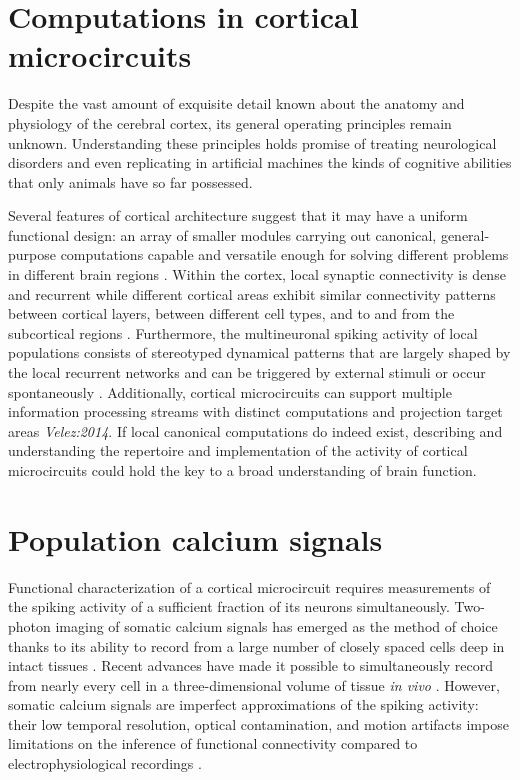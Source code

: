 \section{Computations in cortical microcircuits}
Despite the vast amount of exquisite detail known about the anatomy and physiology of the cerebral cortex, its general operating principles remain unknown. 
Understanding these principles holds promise of treating neurological disorders and even replicating in artificial machines the kinds of cognitive abilities that only animals have so far possessed.

Several features of cortical architecture suggest that it may have a uniform functional design: an array of smaller modules carrying out canonical, general-purpose computations capable and versatile enough for solving different problems in different brain regions \citep{Mountcastle:1997, Douglas:2007}. 
Within the cortex, local synaptic connectivity is dense and recurrent while different cortical areas exhibit similar connectivity patterns between cortical layers, between different cell types, and to and from the subcortical regions \citep{Douglas:2004,Harris:2013}. 
Furthermore, the multineuronal spiking activity of local populations consists of stereotyped dynamical patterns that are largely shaped by the local recurrent networks and can be triggered by external stimuli or occur spontaneously \citep{MacLean:2005,Luczak:2009,Harris:2011,Hofer:2011,Miller:2014}. 
Additionally, cortical microcircuits can support multiple information processing streams with distinct computations and projection target areas \emph{Velez:2014}.
If local canonical computations do indeed exist, describing and understanding the repertoire and implementation of the activity of cortical microcircuits could hold the key to a broad understanding of brain function.

\section{Population calcium signals}
Functional characterization of a cortical microcircuit requires measurements of the spiking activity of a sufficient fraction of its neurons simultaneously. 
Two-photon imaging of somatic calcium signals has emerged as the method of choice thanks to its ability to record from a large number of closely spaced cells deep in intact tissues \citep{Stosiek:2003,Ko:2011,Ko:2013,Hofer:2011}. 
Recent advances have made it possible to simultaneously record from nearly every cell in a three-dimensional volume of tissue \emph{in vivo} \citep{Reddy:2005, Katona:2012, Cotton:2013}. 
However, somatic calcium signals are imperfect approximations of the spiking activity: their low temporal resolution, optical contamination, and motion artifacts impose limitations on the inference of functional connectivity compared to electrophysiological recordings \citep{Gobel:2007,Grewe:2010,Cotton:2013}.

